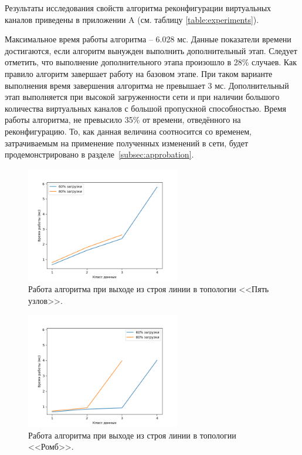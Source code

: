 \documentclass[12pt, a4paper]{article}
\begin{document}
Результаты исследования свойств алгоритма реконфигурации виртуальных каналов приведены в приложении A (см. таблицу \ref{table:experiments}).

Максимальное время работы алгоритма – 6.028 мс. Данные показатели времени достигаются, если алгоритм вынужден выполнить дополнительный этап. Следует отметить, что выполнение дополнительного этапа произошло в 28\% случаев. Как правило алгоритм завершает работу на базовом этапе. При таком варианте выполнения время завершения алгоритма не превышает 3 мс. Дополнительный этап выполняется при высокой загруженности сети и при наличии большого количества виртуальных каналов с большой пропускной способностью. Время работы алгоритма, не превысило 35\% от времени, отведённого на реконфигурацию. То, как данная величина соотносится со временем, затрачиваемым на применение полученных изменений в сети, будет продемонстрировано в разделе~\ref{subsec:approbation}.

\begin{figure}[h!]
	\centering
	\includegraphics[width=0.60\textwidth]{img/5node_res.png}
	\caption{Работа алгоритма при выходе из строя линии в топологии <<Пять узлов>>.}
	\label{pic:5node_res}
\end{figure}

\begin{figure}[h!]
	\centering
	\includegraphics[width=0.60\textwidth]{img/4node_res.png}
	\caption{Работа алгоритма при выходе из строя линии в топологии <<Ромб>>.}
	\label{pic:4node_res}
\end{figure}
\end{document}
